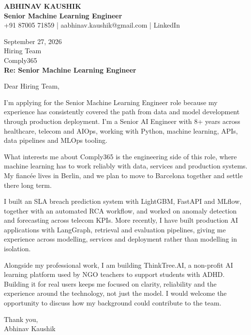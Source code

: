 \documentclass[10pt,a4paper]{article}
\begin{document}
\begin{center}
{\Large\bfseries ABHINAV KAUSHIK}\\[2pt]
{\bfseries Senior Machine Learning Engineer}\\[2pt]
+91 87005 71859 \quad | \quad aabhinav.kaushik@gmail.com \quad | \quad LinkedIn
\end{center}
\vspace{8pt}
September 27, 2026\\[6pt]
Hiring Team\\
Comply365\\[4pt]
\textbf{Re: Senior Machine Learning Engineer}

Dear Hiring Team,

I’m applying for the Senior Machine Learning Engineer role because my experience has consistently covered the path from data and model development through production deployment. I’m a Senior AI Engineer with 8+ years across healthcare, telecom and AIOps, working with Python, machine learning, APIs, data pipelines and MLOps tooling.

What interests me about Comply365 is the engineering side of this role, where machine learning has to work reliably with data, services and production systems. My fiancée lives in Berlin, and we plan to move to Barcelona together and settle there long term.

I built an SLA breach prediction system with LightGBM, FastAPI and MLflow, together with an automated RCA workflow, and worked on anomaly detection and forecasting across telecom KPIs. More recently, I have built production AI applications with LangGraph, retrieval and evaluation pipelines, giving me experience across modelling, services and deployment rather than modelling in isolation.

Alongside my professional work, I am building ThinkTree.AI, a non-profit AI learning platform used by NGO teachers to support students with ADHD. Building it for real users keeps me focused on clarity, reliability and the experience around the technology, not just the model. I would welcome the opportunity to discuss how my background could contribute to the team.

Thank you,\\
Abhinav Kaushik
\end{document}
